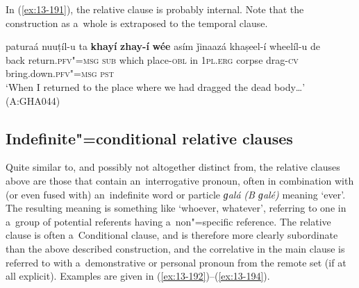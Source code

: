In (\ref{ex:13-191}), the relative clause is probably internal. Note that the construction as a~whole is extraposed to the temporal clause.

\begin{exe}
\ex
\label{ex:13-191}
\gll paturaá nuuṭíl-u ta \textbf{khayí} \textbf{zhay-í} \textbf{wée} asím  ǰinaazá khaṣeel-í wheelíl-u de \\
back return.\textsc{pfv"=msg} \textsc{sub} which place-\textsc{obl} in \textsc{1pl.erg} corpse drag-\textsc{cv}  bring.down.\textsc{pfv"=msg} \textsc{pst}   \\
\glt `When I returned to the place where we had dragged the dead body{\ldots}' (A:GHA044)
\end{exe}

\subsection{Indefinite"=conditional relative clauses}
\label{subsec:13-6-2}

Quite similar to, and possibly not altogether distinct from, the relative clauses above are those that contain an~interrogative pronoun, often in combination with (or even fused with) an~indefinite word or particle \textit{ɡalá} \textit{(B ɡalé)} meaning `ever'. The resulting meaning is something like `whoever, whatever', referring to one in a~group of potential referents having a~non"=specific reference. The relative clause is often a~Conditional clause, and is therefore more clearly subordinate than the above described construction, and the correlative in the main clause is referred to with a~demonstrative or personal pronoun from the remote set (if at all explicit). Examples are given in (\ref{ex:13-192})--(\ref{ex:13-194}).

